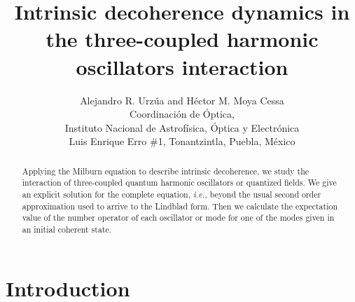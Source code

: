 \documentclass{article}
\title{Intrinsic decoherence dynamics in the three-coupled harmonic oscillators interaction}
\author{
  Alejandro R. Urz\'ua and H\'ector M. Moya Cessa\\
  Coordinaci\'on de \'Optica,\\ Instituto Nacional de Astrof\'isica, \'Optica y Electr\'onica\\ Luis Enrique Erro \#1, Tonantzintla, Puebla, M\'exico
}
\begin{document}
\maketitle

\begin{abstract}
    Applying the Milburn equation to describe intrinsic decoherence, we study the interaction of three-coupled quantum harmonic oscillators or quantized fields. We give an explicit solution for the complete equation, {\it i.e.}, beyond the usual second order approximation used to arrive to the Lindblad form. Then we calculate the expectation value of the number operator of each oscillator or mode for one of the modes given in an initial coherent state. 
\end{abstract}

\section{Introduction}\label{sec:intro}
\end{document}
